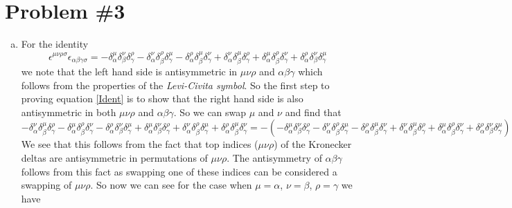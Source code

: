 \documentclass[11pt]{article}
\numberwithin{equation}{section}
\begin{document}
\section{Problem \#3}
\begin{enumerate}[(a)]
\item
    For the identity
    \begin{equation}
        \epsilon^{\mu\nu\rho\sigma}\epsilon_{\alpha\beta\gamma\sigma} = 
            -\delta^{\mu}_{\alpha}\delta^{\nu}_{\beta}\delta^{\rho}_{\gamma}
            -\delta^{\nu}_{\alpha}\delta^{\rho}_{\beta}\delta^{\mu}_{\gamma}
            -\delta^{\rho}_{\alpha}\delta^{\mu}_{\beta}\delta^{\nu}_{\gamma}
            +\delta^{\nu}_{\alpha}\delta^{\mu}_{\beta}\delta^{\rho}_{\gamma}
            +\delta^{\mu}_{\alpha}\delta^{\rho}_{\beta}\delta^{\nu}_{\gamma}
            +\delta^{\rho}_{\alpha}\delta^{\nu}_{\beta}\delta^{\mu}_{\gamma}
        \label{Ident}
    \end{equation}
    we note that the left hand side is antisymmetric in $\mu\nu\rho$ and $\alpha\beta\gamma$ which follows from the 
    properties of the \emph{Levi-Civita symbol}. So the first step to proving equation \ref{Ident} is to show that 
    the right hand side is also antisymmetric in both $\mu\nu\rho$ and $\alpha\beta\gamma$. So we can swap $\mu$ and
    $\nu$ and find that
    $$-\delta^{\nu}_{\alpha}\delta^{\mu}_{\beta}\delta^{\rho}_{\gamma}
      -\delta^{\mu}_{\alpha}\delta^{\rho}_{\beta}\delta^{\nu}_{\gamma}
      -\delta^{\rho}_{\alpha}\delta^{\nu}_{\beta}\delta^{\mu}_{\gamma}
      +\delta^{\mu}_{\alpha}\delta^{\nu}_{\beta}\delta^{\rho}_{\gamma}
      +\delta^{\nu}_{\alpha}\delta^{\rho}_{\beta}\delta^{\mu}_{\gamma}
      +\delta^{\rho}_{\alpha}\delta^{\mu}_{\beta}\delta^{\nu}_{\gamma}
      =
      -(-\delta^{\mu}_{\alpha}\delta^{\nu}_{\beta}\delta^{\rho}_{\gamma}
      -\delta^{\nu}_{\alpha}\delta^{\rho}_{\beta}\delta^{\mu}_{\gamma}
      -\delta^{\rho}_{\alpha}\delta^{\mu}_{\beta}\delta^{\nu}_{\gamma}
      +\delta^{\nu}_{\alpha}\delta^{\mu}_{\beta}\delta^{\rho}_{\gamma}
      +\delta^{\mu}_{\alpha}\delta^{\rho}_{\beta}\delta^{\nu}_{\gamma}
      +\delta^{\rho}_{\alpha}\delta^{\nu}_{\beta}\delta^{\mu}_{\gamma})
      $$
      We see that this follows from the fact that top indices ($\mu\nu\rho$) of the Kronecker deltas are antisymmetric 
      in permutations of $\mu\nu\rho$. The antisymmetry of $\alpha\beta\gamma$ follows from this fact as swapping 
      one of these indices can be considered a swapping of $\mu\nu\rho$. So now we can see for the case when 
      $\mu=\alpha$, $\nu=\beta$, $\rho=\gamma$ we have

\end{enumerate}
\end{document}
